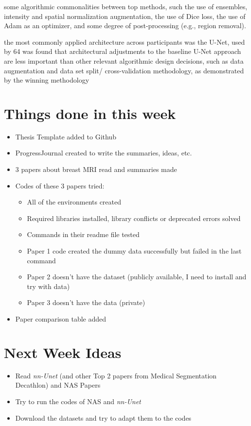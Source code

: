 \documentclass{article}
\begin{document}
some algorithmic commonalities
between top methods, such the use of ensembles, intensity and
spatial normalization augmentation, the use of Dice loss, the use
of Adam as an optimizer, and some degree of post-processing
(e.g., region removal).

the most commonly applied architecture across
participants was the U-Net, used by 64%
was found that architectural adjustments to the baseline U-Net
approach are less important than other relevant algorithmic
design decisions, such as data augmentation and data set split/
cross-validation methodology, as demonstrated by the winning
methodology
\section{Things done in this week }
\begin{itemize}
    \item Thesis Template added to Github
    \item ProgressJournal created to write the summaries, ideas, etc.
    \item 3 papers about breast MRI read and summaries made
    \item Codes of these 3 papers tried:
    \begin{itemize}
      \item All of the environments created
      \item Required libraries installed, library conflicts or deprecated errors solved
      \item Commands in their readme file tested
      \item Paper 1 code created the dummy data successfully but failed in the last command
      \item Paper 2 doesn't have the dataset (publicly available, I need to install and try with data)
      \item Paper 3 doesn't have the data (private)
    \end{itemize}
    \item Paper comparison table added
  \end{itemize}
\section{Next Week Ideas }

\begin{itemize}
    \item Read \textit{nn-Unet} (and other Top 2 papers from Medical Segmentation Decathlon) and NAS Papers
    \item Try to run the codes of NAS and \textit{nn-Unet}
    \item Download the datasets and try to adapt them to the codes
  \end{itemize}
\end{document}
